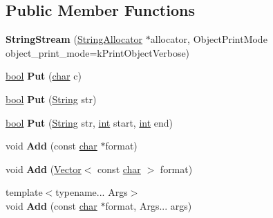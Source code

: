 \subsection*{Public Member Functions}
\begin{DoxyCompactItemize}
\item 
\mbox{\label{classv8_1_1internal_1_1StringStream_a8c233bfed7b292234ab22574b34014a3}} 
{\bfseries String\+Stream} (\mbox{\hyperlink{classv8_1_1internal_1_1StringAllocator}{String\+Allocator}} $\ast$allocator, Object\+Print\+Mode object\+\_\+print\+\_\+mode=k\+Print\+Object\+Verbose)
\item 
\mbox{\label{classv8_1_1internal_1_1StringStream_a24a1a07729bf42969140ba16f3351920}} 
\mbox{\hyperlink{classbool}{bool}} {\bfseries Put} (\mbox{\hyperlink{classchar}{char}} c)
\item 
\mbox{\label{classv8_1_1internal_1_1StringStream_a86145819736b9e719f2a75e7cd70ea4d}} 
\mbox{\hyperlink{classbool}{bool}} {\bfseries Put} (\mbox{\hyperlink{classv8_1_1internal_1_1String}{String}} str)
\item 
\mbox{\label{classv8_1_1internal_1_1StringStream_a4ff50256ce9eb96aa42c0d47451a3353}} 
\mbox{\hyperlink{classbool}{bool}} {\bfseries Put} (\mbox{\hyperlink{classv8_1_1internal_1_1String}{String}} str, \mbox{\hyperlink{classint}{int}} start, \mbox{\hyperlink{classint}{int}} end)
\item 
\mbox{\label{classv8_1_1internal_1_1StringStream_aa3882575a01cba886e200b75ad4225ca}} 
void {\bfseries Add} (const \mbox{\hyperlink{classchar}{char}} $\ast$format)
\item 
\mbox{\label{classv8_1_1internal_1_1StringStream_a1575cac89edd5f8f004d2da49b3fb76b}} 
void {\bfseries Add} (\mbox{\hyperlink{classv8_1_1internal_1_1Vector}{Vector}}$<$ const \mbox{\hyperlink{classchar}{char}} $>$ format)
\item 
\mbox{\label{classv8_1_1internal_1_1StringStream_a355eb9a1ad080ca52510df27d16ab6de}} 
{\footnotesize template$<$typename... Args$>$ }\\void {\bfseries Add} (const \mbox{\hyperlink{classchar}{char}} $\ast$format, Args... args)

\end{DoxyCompactItemize}
